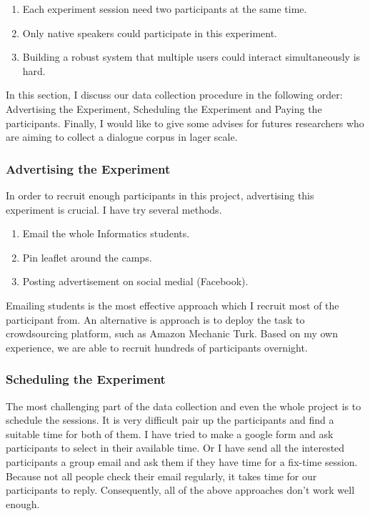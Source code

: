 \documentclass[bsc,frontabs,twoside,singlespacing,parskip,deptreport]{infthesis}     %
\begin{document}
\begin{enumerate}
   \item Each experiment session need two participants at the same time. 

   \item Only native speakers could participate in this experiment.
 
   \item Building a robust system that multiple users could interact simultaneously is hard. 
       
\end{enumerate}

In this section, I discuss our data collection procedure in the following order: Advertising the Experiment, Scheduling the Experiment and Paying the participants. Finally, I would like to give some advises for futures researchers who are aiming to collect a dialogue corpus in lager scale. 


\subsubsection*{Advertising the Experiment}

In order to recruit enough participants in this project, advertising this experiment is crucial. I have try several methods.

\begin{enumerate}
   \item Email the whole Informatics students.

   \item Pin leaflet around the camps. 
 
   \item Posting advertisement on social medial (Facebook).
\end{enumerate}

Emailing students is the most effective approach which I recruit most of the participant from. An alternative is approach is to deploy the task to crowdsourcing platform, such as Amazon Mechanic Turk\cite{mturk}.  Based on my own experience, we are able to recruit hundreds of participants overnight.


\subsubsection*{Scheduling the Experiment}

The most challenging part of the data collection and even the whole project is to schedule the sessions. It is very difficult pair up the participants and find a suitable time for both of them. I have tried to make a google form and ask participants to select in their available time. Or I have send all the interested participants a group email and ask them if they have time for a fix-time session. Because not all people check their email regularly, it takes time for our participants to reply. Consequently, all of the above approaches don't work well enough.
\end{document}
